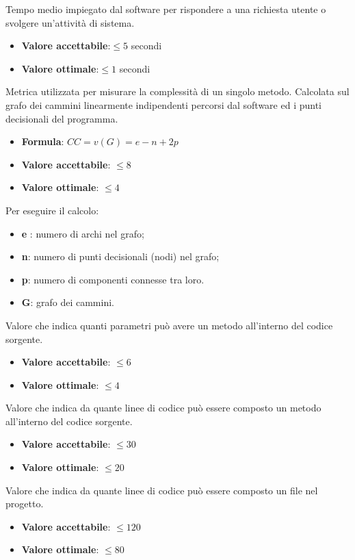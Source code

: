 Tempo medio impiegato dal software per rispondere a una richiesta utente o svolgere un’attività di sistema. 
\begin{itemize}
    \item \textbf{Valore accettabile}:$\leq5$ secondi
    \item \textbf{Valore ottimale}:$\leq1$ secondi
\end{itemize}  

Metrica utilizzata per misurare la complessità di un singolo metodo. Calcolata sul grafo dei cammini linearmente indipendenti percorsi dal software ed i punti decisionali del programma.
\begin{itemize}
    \item \textbf{Formula}: $CC=v(G)=e-n+2p$
    \item \textbf{Valore accettabile}: $\leq8$
    \item \textbf{Valore ottimale}: $\leq4$
\end{itemize}  
Per eseguire il calcolo:
\begin{itemize}
    \item \textbf{e} : numero di archi nel grafo;
    \item \textbf{n}: numero di punti decisionali (nodi) nel grafo;
    \item \textbf{p}: numero di componenti connesse tra loro.
    \item \textbf{G}: grafo dei cammini.
\end{itemize}

Valore che indica quanti parametri può avere un metodo all'interno del codice sorgente.
\begin{itemize}
    \item \textbf{Valore accettabile}: $\leq6$
    \item \textbf{Valore ottimale}: $\leq4$
\end{itemize} 

Valore che indica da quante linee di codice può essere composto un metodo all'interno del codice sorgente.
\begin{itemize}
    \item \textbf{Valore accettabile}: $\leq30$
    \item \textbf{Valore ottimale}: $\leq20$
\end{itemize} 

Valore che indica da quante linee di codice può essere composto un file nel progetto.
\begin{itemize}
    \item \textbf{Valore accettabile}: $\leq120$
    \item \textbf{Valore ottimale}: $\leq80$
\end{itemize} 

